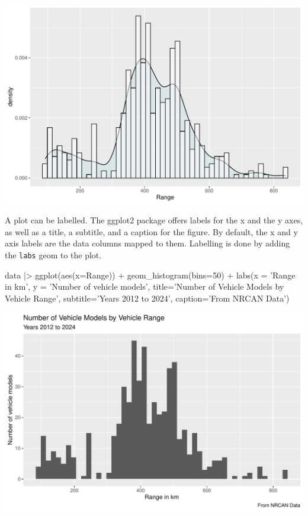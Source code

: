 \begin{center}
  \includegraphics[width=.8\textwidth]{fuel.histogram.pdf}
\end{center}

A plot can be labelled. The ggplot2 package offers labels for the x and the y axes, as well as a title, a subtitle, and a caption for the figure. By default, the x and y axis labels are the data columns mapped to them. Labelling is done by adding the \texttt{labs} geom to the plot.

\begin{Rcode}
data |>  ggplot(aes(x=Range)) + 
    geom_histogram(bins=50) +
    labs(x = 'Range in km',
         y = 'Number of vehicle models',
         title='Number of Vehicle Models by Vehicle Range',
         subtitle='Years 2012 to 2024',
         caption='From NRCAN Data')
\end{Rcode}

\begin{center}
  \includegraphics[width=.8\textwidth]{fuel.histogram.labels.pdf}
\end{center}



